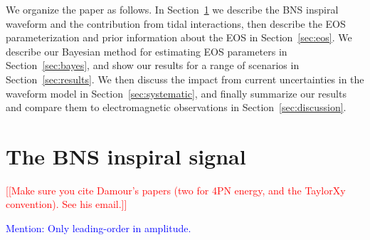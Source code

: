 \documentclass[twocolumn,prd,amssymb,aps,nofootinbib,showpacs,epsf]{revtex4}
\newcommand{\red}{\textcolor{red}}
\newcommand\les[2]{\textcolor{blue}{{#1}\sout{#2}}}
\begin{document}
We organize the paper as follows. In Section~\ref{sec:waveform} we describe the BNS inspiral waveform and the contribution from tidal interactions, then describe the EOS parameterization and prior information about the EOS in Section~\ref{sec:eos}. We describe our Bayesian method for estimating EOS parameters in Section~\ref{sec:bayes}, and show our results for a range of scenarios in Section~\ref{sec:results}. We then discuss the impact from current uncertainties in the waveform model in Section~\ref{sec:systematic}, and finally summarize our results and compare them to electromagnetic observations in Section~\ref{sec:discussion}.


\section{The BNS inspiral signal}
\label{sec:waveform}

\red{[[Make sure you cite Damour's papers (two for 4PN energy, and the TaylorXy convention). See his email.]]}

\les{Mention: Only leading-order in amplitude.}{}
\end{document}
